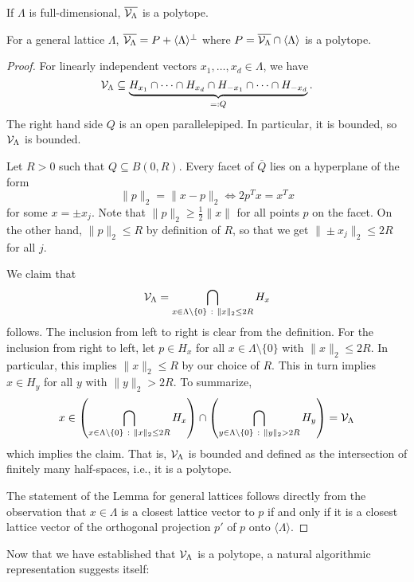 \begin{lemma}
  If $\Lambda$ is full-dimensional, $\overline{\mathcal{V}_\Lambda}$ is a polytope.

  For a general lattice $\Lambda$,
  $\overline{\mathcal{V}_\Lambda} = P + \langle \Lambda \rangle^\bot$
  where $P = \overline{\mathcal{V}_\Lambda} \cap \langle \Lambda \rangle$ is a polytope.
\end{lemma}
\begin{proof}
  For linearly independent vectors $x_1, \ldots, x_d \in \Lambda$,
  we have
  \[
    \mathcal{V}_\Lambda \subseteq
      \underbrace{H_{x_1} \cap \dots \cap H_{x_d} \cap H_{-x_1} \cap \dots \cap H_{-x_d}}_{=: Q}.
  \]
  The right hand side $Q$ is an open parallelepiped.
  In particular, it is bounded, so $\mathcal{V}_\Lambda$ is bounded.

  Let $R > 0$ such that $Q \subseteq B(0,R)$.
  Every facet of $\overline{Q}$ lies on a hyperplane of the form
  \[
    \|p\|_2 = \|x - p\|_2 \iff 2p^Tx = x^Tx
  \]
  for some $x = \pm x_j$.
  Note that $\|p\|_2 \geq \frac{1}{2} \|x\|$ for all points $p$ on the facet.
  On the other hand, $\|p\|_2 \leq R$ by definition of $R$,
  so that we get $\|\pm x_j\|_2 \leq 2R$ for all $j$.

  We claim that
  \[
    \mathcal{V}_\Lambda = \bigcap_{x \in \Lambda\setminus\{0\} ~:~ \|x\|_2 \leq 2R} H_x
  \]
  follows.
  The inclusion from left to right is clear from the definition.
  For the inclusion from right to left,
  let $p \in H_x$ for all $x \in \Lambda\setminus\{0\}$ with $\|x\|_2 \leq 2R$.
  In particular, this implies $\|x\|_2 \leq R$ by our choice of $R$.
  This in turn implies $x \in H_y$ for all $y$ with $\|y\|_2 > 2R$.
  To summarize,
  \[
     x \in \left( \bigcap_{x \in \Lambda\setminus\{0\} ~:~ \|x\|_2 \leq 2R} H_x \right)
      \cap \left( \bigcap_{y \in \Lambda\setminus\{0\} ~:~ \|y\|_2 > 2R} H_y \right) = \mathcal{V}_\Lambda
  \]
  which implies the claim.
  That is, $\mathcal{V}_\Lambda$ is bounded and defined as the intersection of finitely many half-spaces,
  i.e., it is a polytope.

  The statement of the Lemma for general lattices follows
  directly from the observation that $x \in \Lambda$ is a closest lattice vector to $p$
  if and only if it is a closest lattice vector of the orthogonal projection $p'$ of $p$
  onto $\langle \Lambda \rangle$.
\end{proof}

Now that we have established that $\mathcal{V}_\Lambda$ is a polytope,
a natural algorithmic representation suggests itself:

